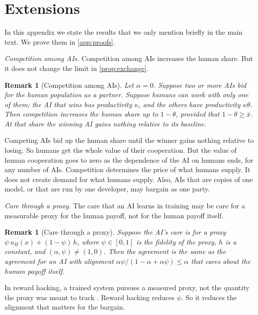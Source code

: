 \documentclass[article, 11pt, reqno]{amsart}
\newtheorem{remark}[theorem]{Remark}
\theoremstyle{named}
\theoremstyle{plain}
\begin{document}



\appendix
\section{Extensions}\label{app:extensions}

In this appendix we state the results that we only mention briefly in the main text. We prove them in \cref{app:proofs}.

\textit{Competition among AIs.} Competition among AIs increases the human share. But it does not change the limit in \cref{prop:exchange}.

\begin{remark}[Competition among AIs]\label{prop:competition}
Let $\alpha = 0$. Suppose two or more AIs bid for the human population as a partner. Suppose humans can work with only one of them; the AI that wins has productivity $\kappa$, and the others have productivity $\kappa\theta$. Then competition increases the human share up to $1-\theta$, provided that $1-\theta \ge \bar{x}$. At that share the winning AI gains nothing relative to its baseline.
\end{remark}

Competing AIs bid up the human share until the winner gains nothing relative to losing. So humans get the whole value of their cooperation. But the value of human cooperation goes to zero as the dependence of the AI on humans ends, for any number of AIs. Competition determines the price of what humans supply. It does not create demand for what humans supply. Also, AIs that are copies of one model, or that are run by one developer, may bargain as one party.

\textit{Care through a proxy.} The care that an AI learns in training may be care for a measurable proxy for the human payoff, not for the human payoff itself.

\begin{remark}[Care through a proxy]\label{prop:proxy}
Suppose the AI's care is for a proxy $\psi\, u_H(x) + (1-\psi)\, h$, where $\psi \in [0,1]$ is the fidelity of the proxy, $h$ is a constant, and $(\alpha, \psi) \ne (1, 0)$. Then the agreement is the same as the agreement for an AI with alignment $\alpha\psi/(1 - \alpha + \alpha\psi) \le \alpha$ that cares about the human payoff itself.
\end{remark}

In reward hacking, a trained system pursues a measured proxy, not the quantity the proxy was meant to track \citep{Skalse2022}. Reward hacking reduces $\psi$. So it reduces the alignment that matters for the bargain.
\end{document}
